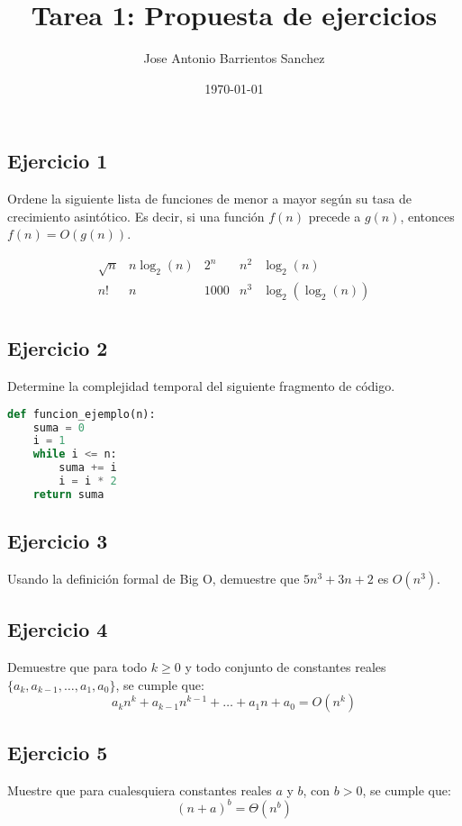 \documentclass[12pt,letterpaper]{article}
\title{Tarea 1: Propuesta de ejercicios}
\author{Jose Antonio Barrientos Sanchez}
\date{\today}
\begin{document}
\maketitle

\hrulefill
\vspace{1cm}

\subsection*{Ejercicio 1}

Ordene la siguiente lista de funciones de menor a mayor según su tasa de crecimiento asintótico. Es decir, si una función $f(n)$ precede a $g(n)$, entonces $f(n) = O(g(n))$.

$$
\begin{array}{ccccc}
    \sqrt{n} & n \log_2(n) & 2^n & n^2 & \log_2(n) \\
    n! & n & 1000 & n^3 & \log_2(\log_2(n)) \\
\end{array}
$$

\subsection*{Ejercicio 2}
Determine la complejidad temporal del siguiente fragmento de código.

\begin{lstlisting}[language=Python, caption=Bucle simple]
def funcion_ejemplo(n):
    suma = 0
    i = 1
    while i <= n:
        suma += i
        i = i * 2
    return suma
\end{lstlisting}



\subsection*{Ejercicio 3}
Usando la definición formal de Big O, demuestre que $5n^3+ 3n + 2$ es $O(n^3)$.

\subsection*{Ejercicio 4}

Demuestre que para todo $k \geq 0$ y todo conjunto de constantes reales $\{a_k, a_{k-1}, \dots, a_1, a_0\}$, se cumple que:
    $$ a_k n^k + a_{k-1} n^{k-1} + \dots + a_1 n + a_0 = O(n^k) $$

\subsection*{Ejercicio 5}
    
    Muestre que para cualesquiera constantes reales $a$ y $b$, con $b > 0$, se cumple que:
    $$ (n + a)^b = \Theta(n^b) $$
\end{document}
